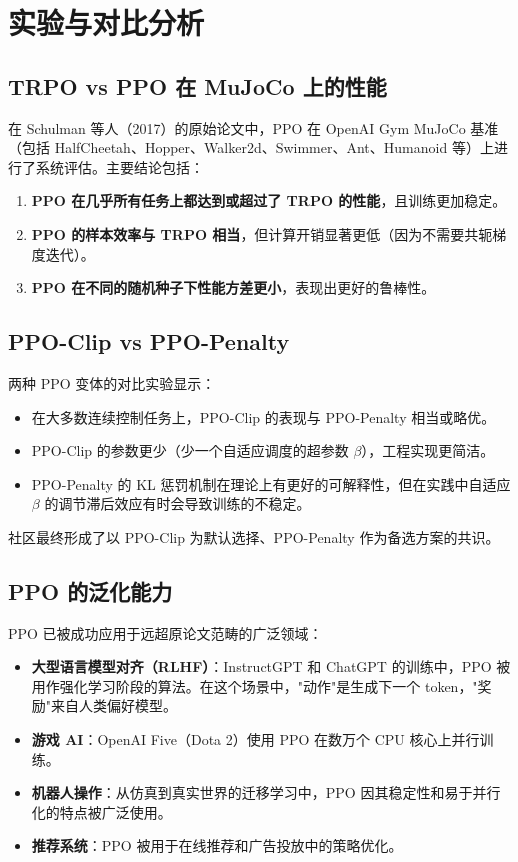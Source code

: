 \section{实验与对比分析}

\subsection{TRPO vs PPO 在 MuJoCo 上的性能}

在 Schulman 等人（2017）的原始论文中，PPO 在 OpenAI Gym MuJoCo 基准（包括 HalfCheetah、Hopper、Walker2d、Swimmer、Ant、Humanoid 等）上进行了系统评估。主要结论包括：

\begin{enumerate}
    \item \textbf{PPO 在几乎所有任务上都达到或超过了 TRPO 的性能}，且训练更加稳定。
    \item \textbf{PPO 的样本效率与 TRPO 相当}，但计算开销显著更低（因为不需要共轭梯度迭代）。
    \item \textbf{PPO 在不同的随机种子下性能方差更小}，表现出更好的鲁棒性。
\end{enumerate}

\subsection{PPO-Clip vs PPO-Penalty}

两种 PPO 变体的对比实验显示：

\begin{itemize}
    \item 在大多数连续控制任务上，PPO-Clip 的表现与 PPO-Penalty 相当或略优。
    \item PPO-Clip 的参数更少（少一个自适应调度的超参数 $\beta$），工程实现更简洁。
    \item PPO-Penalty 的 KL 惩罚机制在理论上有更好的可解释性，但在实践中自适应 $\beta$ 的调节滞后效应有时会导致训练的不稳定。
\end{itemize}

社区最终形成了以 PPO-Clip 为默认选择、PPO-Penalty 作为备选方案的共识。

\subsection{PPO 的泛化能力}

PPO 已被成功应用于远超原论文范畴的广泛领域：

\begin{itemize}
    \item \textbf{大型语言模型对齐（RLHF）}：InstructGPT 和 ChatGPT 的训练中，PPO 被用作强化学习阶段的算法。在这个场景中，"动作"是生成下一个 token，"奖励"来自人类偏好模型。
    \item \textbf{游戏 AI}：OpenAI Five（Dota 2）使用 PPO 在数万个 CPU 核心上并行训练。
    \item \textbf{机器人操作}：从仿真到真实世界的迁移学习中，PPO 因其稳定性和易于并行化的特点被广泛使用。
    \item \textbf{推荐系统}：PPO 被用于在线推荐和广告投放中的策略优化。
\end{itemize}

